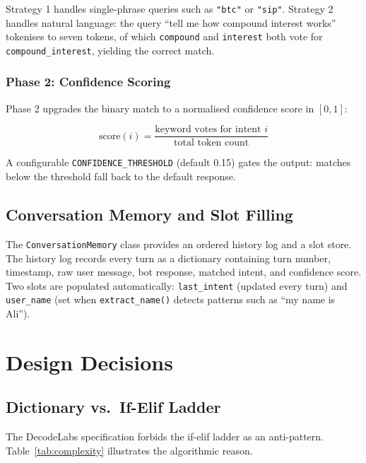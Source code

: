 \documentclass[12pt, a4paper]{article}
\begin{document}
Strategy 1 handles single-phrase queries such as \texttt{"btc"} or
\texttt{"sip"}. Strategy 2 handles natural language: the query
``tell me how compound interest works'' tokenises to seven tokens,
of which \texttt{compound} and \texttt{interest} both vote for
\texttt{compound\_interest}, yielding the correct match.

\subsubsection{Phase 2: Confidence Scoring}

Phase 2 upgrades the binary match to a normalised confidence score in $[0,1]$:

\begin{equation}
    \text{score}(i) = \frac{\text{keyword votes for intent } i}{\text{total token count}}
\end{equation}

A configurable \texttt{CONFIDENCE\_THRESHOLD} (default 0.15) gates the output:
matches below the threshold fall back to the default response.

\subsection{Conversation Memory and Slot Filling}

The \texttt{ConversationMemory} class provides an ordered history log and a
slot store. The history log records every turn as a dictionary containing
turn number, timestamp, raw user message, bot response, matched intent, and
confidence score. Two slots are populated automatically:
\texttt{last\_intent} (updated every turn) and \texttt{user\_name} (set
when \texttt{extract\_name()} detects patterns such as ``my name is Ali'').

\section{Design Decisions}

\subsection{Dictionary vs.\ If-Elif Ladder}

The DecodeLabs specification forbids the if-elif ladder as an anti-pattern.
Table~\ref{tab:complexity} illustrates the algorithmic reason.
\end{document}
